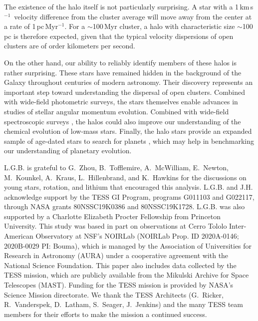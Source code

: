\documentclass[12pt,twocolumn,tighten]{aastex63}
\newcommand{\kms}{\,km\,s$^{-1}$}
\begin{document}
The existence of the halo itself is not particularly surprising.  A
star with a 1\kms\ velocity difference from the cluster average will
move away from the center at a rate of 1\,pc\,Myr$^{-1}$.  For a
$\sim$100\,Myr cluster, a halo with characteristic size $\sim$100\,pc
is therefore expected, given that the typical velocity dispersions of
open clusters are of order kilometers per second.

On the other hand, our ability to reliably identify members of these
halos is rather surprising.  These stars have remained hidden in the
background of the Galaxy throughout centuries of modern astronomy.
Their discovery represents an important step toward understanding
the dispersal of open clusters.
Combined with wide-field photometric surveys, the stars themselves
enable advances in studies of stellar
angular momentum evolution.
Combined with wide-field spectroscopic
surveys \citep[{\it e.g.},][]{kollmeier_2017}, the halos could also
improve our
understanding of the chemical evolution of low-mass stars.
Finally, the halo stars provide an expanded sample of
age-dated stars to search for planets \citep[{\it
e.g.},][]{newton_2021}, which may help in benchmarking our understanding of
planetary evolution.





\acknowledgements
\raggedbottom

L.G.B{.} is grateful to G.~Zhou, B{.}~Tofflemire, A{.}~McWilliam,
E{.}~Newton, M{.}~Kounkel, A{.}~Kraus, L{.}~Hillenbrand, and
K{.}~Hawkins for the discussions on young stars, rotation, and lithium
that encouraged this analysis.
%
L.G.B{.} and J.H{.} acknowledge support by the TESS GI Program, programs
G011103 and G022117, through NASA grants 80NSSC19K0386 and
80NSSC19K1728.
%
L.G.B{.} was also supported by a Charlotte Elizabeth Procter Fellowship
from Princeton University.
%
This study was based in part on observations at Cerro Tololo
Inter-American Observatory at NSF's NOIRLab (NOIRLab Prop{.} ID
2020A-0146; 2020B-0029 PI: Bouma), which is managed by the
Association of Universities for Research in Astronomy (AURA) under a
cooperative agreement with the National Science Foundation.
%
%
This paper also includes data collected by the TESS mission, which are
publicly available from the Mikulski Archive for Space Telescopes
(MAST).
%
Funding for the TESS mission is provided by NASA's Science Mission
directorate.
%
We thank the TESS Architects (G.~Ricker, R.~Vanderspek, D.~Latham,
S.~Seager, J.~Jenkins) and the many TESS team members for their
efforts to make the mission a continued success.
%
\end{document}

